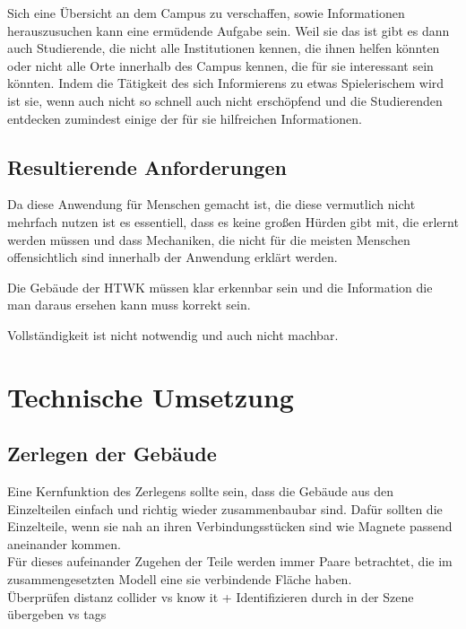 \documentclass[11pt]{article} %
\begin{document}
 Sich eine Übersicht an dem Campus zu verschaffen, sowie Informationen herauszusuchen kann eine ermüdende Aufgabe sein. Weil sie das ist gibt es dann auch Studierende, die nicht alle Institutionen kennen, die ihnen helfen könnten oder nicht alle Orte innerhalb des Campus kennen, die für sie interessant sein könnten. Indem die Tätigkeit des sich Informierens zu etwas Spielerischem wird ist sie, wenn auch nicht so schnell auch nicht erschöpfend und die Studierenden entdecken zumindest einige der für sie hilfreichen Informationen.


\subsection{Resultierende Anforderungen}

Da diese Anwendung für Menschen gemacht ist, die diese vermutlich nicht mehrfach nutzen ist es essentiell, dass es keine großen Hürden gibt mit, die erlernt werden müssen und dass Mechaniken, die nicht für die meisten Menschen offensichtlich sind innerhalb der Anwendung erklärt werden.

Die Gebäude der HTWK müssen klar erkennbar sein und die Information die man daraus ersehen kann muss korrekt sein.

Vollständigkeit ist nicht notwendig und auch nicht machbar.




\section{Technische Umsetzung}

\subsection{Zerlegen der Gebäude}

Eine Kernfunktion des Zerlegens sollte sein, dass die Gebäude aus den Einzelteilen einfach und richtig wieder zusammenbaubar sind. Dafür sollten die Einzelteile, wenn sie nah an ihren Verbindungsstücken sind wie Magnete passend aneinander kommen.\\

Für dieses aufeinander Zugehen der Teile werden immer Paare betrachtet, die im zusammengesetzten Modell eine sie verbindende Fläche haben. \\

Überprüfen distanz collider vs know it  +  Identifizieren durch in der Szene übergeben vs tags \\
\end{document}
